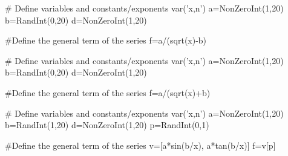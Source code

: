 \begin{sagesilent}
# Define variables and constants/exponents
var('x,n')
a=NonZeroInt(1,20)
b=RandInt(0,20)
d=NonZeroInt(1,20)

#Define the general term of the series
f=a/(sqrt(x)-b)

\end{sagesilent}


\begin{sagesilent}
# Define variables and constants/exponents
var('x,n')
a=NonZeroInt(1,20)
b=RandInt(0,20)
d=NonZeroInt(1,20)

#Define the general term of the series
f=a/(sqrt(x)+b)

\end{sagesilent}


\begin{sagesilent}
# Define variables and constants/exponents
var('x,n')
a=NonZeroInt(1,20)
b=RandInt(1,20)
d=NonZeroInt(1,20)
p=RandInt(0,1)

#Define the general term of the series
v=[a*sin(b/x), a*tan(b/x)]
f=v[p]

\end{sagesilent}

